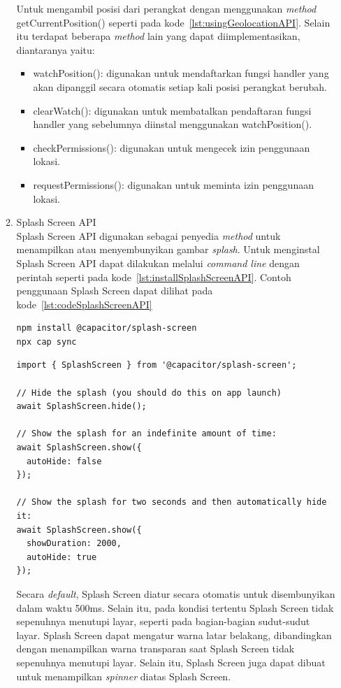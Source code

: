 \begin{enumerate}
\begin{enumerate}
		Untuk mengambil posisi dari perangkat dengan menggunakan \textit{method} getCurrentPosition() seperti pada kode~\ref{lst:usingGeolocationAPI}. Selain itu terdapat beberapa \textit{method} lain yang dapat diimplementasikan, diantaranya yaitu:
		\newpage
			\begin{itemize}
				\item watchPosition(): digunakan untuk mendaftarkan fungsi handler yang akan dipanggil secara otomatis setiap kali posisi perangkat berubah.
				\item clearWatch(): digunakan untuk membatalkan pendaftaran fungsi handler yang sebelumnya diinstal menggunakan watchPosition().
				\item checkPermissions(): digunakan untuk mengecek izin penggunaan lokasi.
				\item requestPermissions(): digunakan untuk meminta izin penggunaan lokasi.
			\end{itemize}
			\item Splash Screen API	\\
			Splash Screen API digunakan sebagai penyedia \textit{method} untuk menampilkan atau menyembunyikan gambar \textit{splash}. Untuk menginstal Splash Screen API dapat dilakukan melalui \textit{command line} dengan perintah seperti pada kode~\ref{lst:installSplashScreenAPI}. Contoh penggunaan Splash Screen dapat dilihat pada kode~\ref{lst:codeSplashScreenAPI}
\begin{lstlisting}[label={lst:installSplashScreenAPI}, caption=Kode untuk Menginstal Splash Screen API]
npm install @capacitor/splash-screen
npx cap sync
\end{lstlisting}

\begin{lstlisting}[label={lst:codeSplashScreenAPI}, caption=Contoh Kode Penggunaan Splash Screen API]
import { SplashScreen } from '@capacitor/splash-screen';

// Hide the splash (you should do this on app launch)
await SplashScreen.hide();

// Show the splash for an indefinite amount of time:
await SplashScreen.show({
  autoHide: false
});

// Show the splash for two seconds and then automatically hide it:
await SplashScreen.show({
  showDuration: 2000,
  autoHide: true
});
\end{lstlisting}
			
			Secara \textit{default}, Splash Screen diatur secara otomatis untuk disembunyikan dalam waktu 500ms. Selain itu, pada kondisi tertentu Splash Screen tidak sepenuhnya menutupi layar, seperti pada bagian-bagian sudut-sudut layar. Splash Screen dapat mengatur warna latar belakang, dibandingkan dengan menampilkan warna transparan saat Splash Screen tidak sepenuhnya menutupi layar. Selain itu, Splash Screen juga dapat dibuat untuk menampilkan \textit{spinner} diatas Splash Screen. 
		

\end{enumerate}
\end{enumerate}
